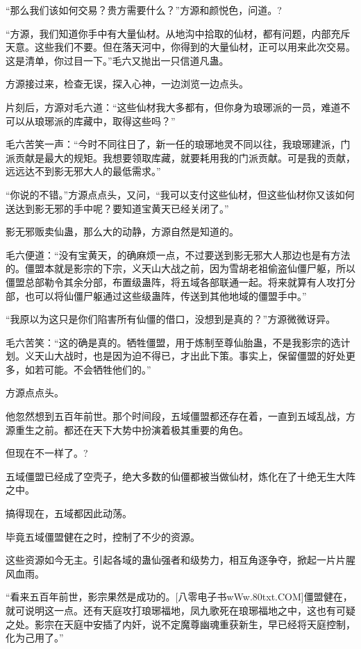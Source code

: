 
\begin{this_body}

“那么我们该如何交易？贵方需要什么？”方源和颜悦色，问道。?

“方源，我们知道你手中有大量仙材。从地沟中拾取的仙材，都有问题，内部充斥天意。这些我们不要。但在落天河中，你得到的大量仙材，正可以用来此次交易。这是清单，你过目一下。”毛六又抛出一只信道凡蛊。

方源接过来，检查无误，探入心神，一边浏览一边点头。

片刻后，方源对毛六道：“这些仙材我大多都有，但你身为琅琊派的一员，难道不可以从琅琊派的库藏中，取得这些吗？”

毛六苦笑一声：“今时不同往日了，新一任的琅琊地灵不同以往，我琅琊建派，门派贡献是最大的规矩。我想要领取库藏，就要耗用我的门派贡献。可是我的贡献，远远达不到影无邪大人的最低需求。”

“你说的不错。”方源点点头，又问，“我可以支付这些仙材，但这些仙材你又该如何送达到影无邪的手中呢？要知道宝黄天已经关闭了。”

影无邪贩卖仙蛊，那么大的动静，方源自然是知道的。

毛六便道：“没有宝黄天，的确麻烦一点，不过要送到影无邪大人那边也是有方法的。僵盟本就是影宗的下宗，义天山大战之前，因为雪胡老祖偷盗仙僵尸躯，所以僵盟总部勒令其余分部，布置级蛊阵，将五域各部联通一起。将来就算有人攻打分部，也可以将仙僵尸躯通过这些级蛊阵，传送到其他地域的僵盟手中。”

“我原以为这只是你们陷害所有仙僵的借口，没想到是真的？”方源微微讶异。

毛六苦笑：“这的确是真的。牺牲僵盟，用于炼制至尊仙胎蛊，不是我影宗的选计划。义天山大战时，也是因为迫不得已，才出此下策。事实上，保留僵盟的好处更多，如若可能。不会牺牲他们的。”

方源点点头。

他忽然想到五百年前世。那个时间段，五域僵盟都还存在着，一直到五域乱战，方源重生之前。都还在天下大势中扮演着极其重要的角色。

但现在不一样了。?

五域僵盟已经成了空壳子，绝大多数的仙僵都被当做仙材，炼化在了十绝无生大阵之中。

搞得现在，五域都因此动荡。

毕竟五域僵盟健在之时，控制了不少的资源。

这些资源如今无主。引起各域的蛊仙强者和级势力，相互角逐争夺，掀起一片片腥风血雨。

“看来五百年前世，影宗果然是成功的。[八零电子书wWw.80txt.COM]僵盟健在，就可说明这一点。还有天庭攻打琅琊福地，凤九歌死在琅琊福地之中，这也有可疑之处。影宗在天庭中安插了内奸，说不定魔尊幽魂重获新生，早已经将天庭控制，化为己用了。”


\end{this_body}

